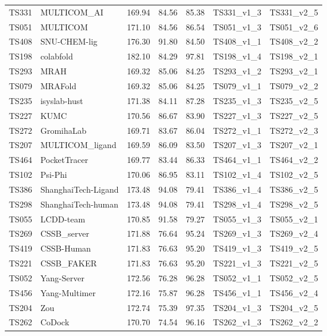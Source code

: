 \begin{longtable}{lllllll}
TS331 & MULTICOM\_AI & 169.94 & 84.56 & 85.38 & TS331\_v1\_3 & TS331\_v2\_5 \\ 
TS051 & MULTICOM & 171.10 & 84.56 & 86.54 & TS051\_v1\_3 & TS051\_v2\_6 \\ 
TS408 & SNU-CHEM-lig & 176.30 & 91.80 & 84.50 & TS408\_v1\_1 & TS408\_v2\_2 \\ 
TS198 & colabfold & 182.10 & 84.29 & 97.81 & TS198\_v1\_4 & TS198\_v2\_1 \\ 
TS293 & MRAH & 169.32 & 85.06 & 84.25 & TS293\_v1\_2 & TS293\_v2\_1 \\ 
TS079 & MRAFold & 169.32 & 85.06 & 84.25 & TS079\_v1\_1 & TS079\_v2\_2 \\ 
TS235 & isyslab-hust & 171.38 & 84.11 & 87.28 & TS235\_v1\_3 & TS235\_v2\_5 \\ 
TS227 & KUMC & 170.56 & 86.67 & 83.90 & TS227\_v1\_3 & TS227\_v2\_5 \\ 
TS272 & GromihaLab & 169.71 & 83.67 & 86.04 & TS272\_v1\_1 & TS272\_v2\_3 \\ 
TS207 & MULTICOM\_ligand & 169.59 & 86.09 & 83.50 & TS207\_v1\_3 & TS207\_v2\_1 \\ 
TS464 & PocketTracer & 169.77 & 83.44 & 86.33 & TS464\_v1\_1 & TS464\_v2\_2 \\ 
TS102 & Psi-Phi & 170.06 & 86.95 & 83.11 & TS102\_v1\_4 & TS102\_v2\_5 \\ 
TS386 & ShanghaiTech-Ligand & 173.48 & 94.08 & 79.41 & TS386\_v1\_4 & TS386\_v2\_5 \\ 
TS298 & ShanghaiTech-human & 173.48 & 94.08 & 79.41 & TS298\_v1\_4 & TS298\_v2\_5 \\ 
TS055 & LCDD-team & 170.85 & 91.58 & 79.27 & TS055\_v1\_3 & TS055\_v2\_1 \\ 
TS269 & CSSB\_server & 171.88 & 76.64 & 95.24 & TS269\_v1\_3 & TS269\_v2\_4 \\ 
TS419 & CSSB-Human & 171.83 & 76.63 & 95.20 & TS419\_v1\_3 & TS419\_v2\_5 \\ 
TS221 & CSSB\_FAKER & 171.83 & 76.63 & 95.20 & TS221\_v1\_3 & TS221\_v2\_5 \\ 
TS052 & Yang-Server & 172.56 & 76.28 & 96.28 & TS052\_v1\_1 & TS052\_v2\_5 \\ 
TS456 & Yang-Multimer & 172.16 & 75.87 & 96.28 & TS456\_v1\_1 & TS456\_v2\_4 \\ 
TS204 & Zou & 172.74 & 75.39 & 97.35 & TS204\_v1\_3 & TS204\_v2\_5 \\ 
TS262 & CoDock & 170.70 & 74.54 & 96.16 & TS262\_v1\_3 & TS262\_v2\_2 \\ 

\end{longtable}
